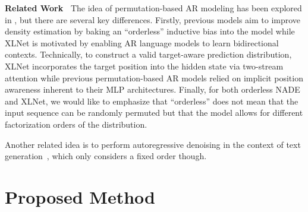 \documentclass{article}
\begin{document}
\textbf{Related Work~} The idea of permutation-based AR modeling has been explored in \cite{uria2016neural,germain2015made}, but there are several key differences.
Firstly, previous models aim to improve density estimation by baking an ``orderless'' inductive bias into the model while XLNet is motivated by enabling AR language models to learn bidirectional contexts.
Technically, to construct a valid target-aware prediction distribution, XLNet incorporates the target position into the hidden state via two-stream attention while previous permutation-based AR models relied on implicit position awareness inherent to their MLP architectures.
Finally, for both orderless NADE and XLNet, we would like to emphasize that ``orderless'' does not mean that the input sequence can be randomly permuted but that the model allows for different factorization orders of the distribution.



Another related idea is to perform autoregressive denoising in the context of text generation~\cite{fedus2018maskgan}, which only considers a fixed order though.













 






 \section{Proposed Method}
\end{document}

